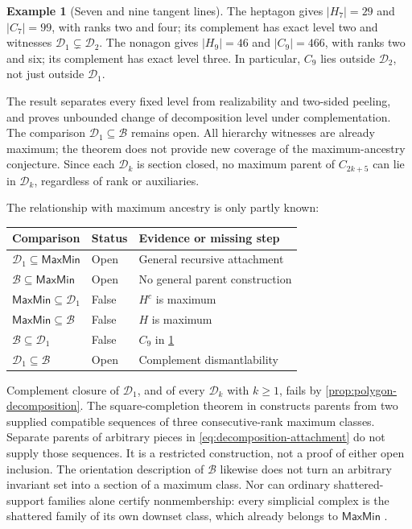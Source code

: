 \documentclass[11pt]{article}
\theoremstyle{definition}
\newtheorem{example}[proposition]{Example}
\newcommand{\MaxMin}{\mathsf{MaxMin}}
\begin{document}
\begin{example}[Seven and nine tangent lines]\label{ex:nonagon-decomposition}
The heptagon gives $|H_7|=29$ and $|C_7|=99$, with ranks two and four;
its complement has exact level two and witnesses
$\mathcal D_1\subsetneq\mathcal D_2$.
The nonagon gives $|H_9|=46$ and $|C_9|=466$, with ranks two and six;
its complement has exact level three. In particular, $C_9$ lies
outside $\mathcal D_2$, not just outside $\mathcal D_1$.
\end{example}

The result separates every fixed level from realizability and two-sided
peeling, and proves unbounded change of decomposition level under
complementation. The comparison $\mathcal D_1\subseteq\mathcal B$
remains open. All hierarchy witnesses are already maximum; the theorem
does not provide new coverage of the maximum-ancestry conjecture.
Since each $\mathcal D_k$ is section closed, no maximum parent of
$C_{2k+5}$ can lie in $\mathcal D_k$, regardless of rank or auxiliaries.

The relationship with maximum ancestry is only partly known:
\begin{center}
\begin{tabular}{@{}lll@{}}
\toprule
Comparison & Status & Evidence or missing step\\
\midrule
$\mathcal D_1\subseteq\MaxMin$ & Open & General recursive attachment\\
$\mathcal B\subseteq\MaxMin$ & Open & No general parent construction\\
$\MaxMin\subseteq\mathcal D_1$ & False & $H^c$ is maximum\\
$\MaxMin\subseteq\mathcal B$ & False & $H$ is maximum\\
$\mathcal B\subseteq\mathcal D_1$ & False & $C_9$ in \cref{ex:nonagon-decomposition}\\
$\mathcal D_1\subseteq\mathcal B$ & Open & Complement dismantlability\\
\bottomrule
\end{tabular}
\end{center}
Complement closure of $\mathcal D_1$, and of every $\mathcal D_k$ with
$k\ge1$, fails by \cref{prop:polygon-decomposition}.
The square-completion theorem in \cite{MaxParents} constructs parents
from two supplied compatible sequences of three consecutive-rank maximum
classes. Separate parents of arbitrary pieces in
\eqref{eq:decomposition-attachment} do not supply those sequences.
It is a restricted construction, not a proof of either open inclusion.
The orientation description of $\mathcal B$ likewise does not turn an
arbitrary invariant set into a section of a maximum class. Nor can ordinary
shattered-support families alone certify nonmembership: every simplicial
complex is the shattered family of its own downset class, which already
belongs to $\MaxMin$ \cite{RecursiveClasses}.
\end{document}
